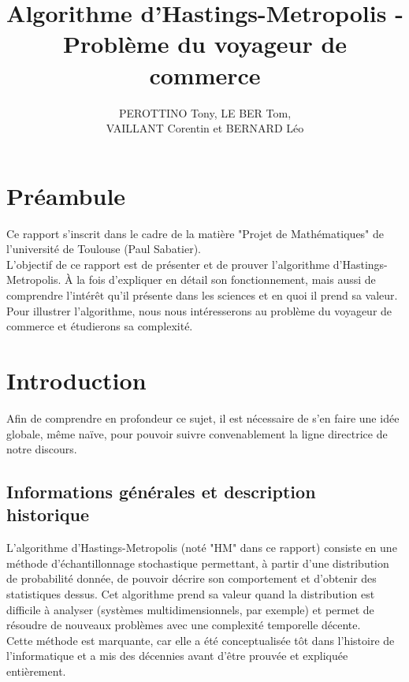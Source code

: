 \documentclass{article}
\title{Algorithme d'Hastings-Metropolis - Problème du voyageur de commerce}
\author{PEROTTINO Tony, LE BER Tom, \\ VAILLANT Corentin et BERNARD Léo}
\begin{document}
\maketitle

\newpage
\tableofcontents
\newpage

\section*{Préambule}

Ce rapport s'inscrit dans le cadre de la matière "Projet de Mathématiques" de l'université de Toulouse (Paul Sabatier). \\
L'objectif de ce rapport est de présenter et de prouver l'algorithme d'Hastings-Metropolis. À la fois d'expliquer en détail son fonctionnement, mais aussi de comprendre l'intérêt qu'il présente dans les sciences et en quoi il prend sa valeur. \\
Pour illustrer l'algorithme, nous nous intéresserons au problème du voyageur de commerce et étudierons sa complexité.


\section{Introduction}

Afin de comprendre en profondeur ce sujet, il est nécessaire de s'en faire une idée globale, même naïve, pour pouvoir suivre convenablement la ligne directrice de notre discours.

\subsection{Informations générales et description historique}

L'algorithme d'Hastings-Metropolis (noté "HM" dans ce rapport) consiste en une méthode d'échantillonnage stochastique permettant, à partir d'une distribution de probabilité donnée, de pouvoir décrire son comportement et d'obtenir des statistiques dessus. Cet algorithme prend sa valeur quand la distribution est difficile à analyser (systèmes multidimensionnels, par exemple) et permet de résoudre de nouveaux problèmes avec une complexité temporelle décente. \\
Cette méthode est marquante, car elle a été conceptualisée tôt dans l'histoire de l'informatique et a mis des décennies avant d'être prouvée et expliquée entièrement. \\
\end{document}
